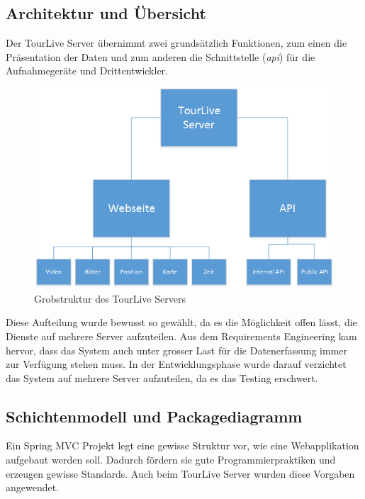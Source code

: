 \subsection{Architektur und Übersicht}
Der TourLive Server übernimmt zwei grundsätzlich Funktionen, zum einen die Präsentation der Daten und zum anderen die Schnittstelle (\textit{\gls{api}}) für die Aufnahmegeräte und Drittentwickler.
\begin{figure}[H]
	\centering
	\includegraphics[width=130mm]{images/tourliveweb/uebersicht_tourlive.png}
	\caption{Grobstruktur des TourLive Servers}
	\label{fig:grobstrukturtourliveserver}
\end{figure}
Diese Aufteilung wurde bewusst so gewählt, da es die Möglichkeit offen lässt, die Dienste auf mehrere Server aufzuteilen. Aus dem Requirements Engineering kam hervor, dass das System auch unter grosser Last für die Datenerfassung immer zur Verfügung stehen muss. In der Entwicklungsphase wurde darauf verzichtet das System auf mehrere Server aufzuteilen, da es das Testing erschwert.

\subsection{Schichtenmodell und Packagediagramm}
Ein Spring MVC Projekt legt eine gewisse Struktur vor, wie eine Webapplikation aufgebaut werden soll. Dadurch fördern sie gute Programmierpraktiken und erzeugen gewisse Standards. Auch beim TourLive Server wurden diese Vorgaben angewendet.
\\

